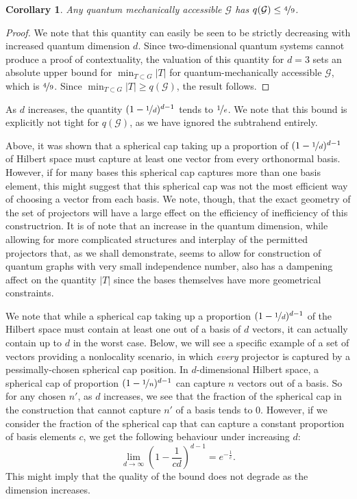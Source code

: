 \documentclass{amsart}
\newtheorem{cor}{Corollary}
\theoremstyle{definition}
\begin{document}
\begin{cor}
Any quantum mechanically accessible $\mathcal{G}$ has  $q(\mathcal{G})\leq\nicefrac49$.
\end{cor}
\begin{proof}
We note that this quantity can easily be seen to be strictly decreasing with increased quantum dimension $d$. Since two-dimensional quantum systems cannot produce a proof of contextuality, the valuation of this quantity for $d=3$ sets an absolute upper bound for $\min_{T\subset G}|T|$ for quantum-mechanically accessible $\mathcal{G}$, which is $\nicefrac49$. Since $\min_{T\subset G}|T|\geq q(\mathcal{G})$, the result follows.
\end{proof}
As $d$ increases, the quantity $(1-\nicefrac1d)^{d-1}$ tends to $\nicefrac1e$. We note that this bound is explicitly not tight for $q(\mathcal{G})$, as we have ignored the subtrahend entirely. %

Above, it was shown that a spherical cap taking up a proportion of $(1-\nicefrac1d)^{d-1}$ of Hilbert space must capture at least one vector from every orthonormal basis. However, if for many bases this spherical cap captures more than one basis element, this might suggest that this spherical cap was not the most efficient way of choosing a vector from each basis. We note, though, that the exact geometry of the set of projectors will have a large effect on the efficiency of inefficiency of this constructrion. It is of note that an increase in the quantum dimension, while allowing for more complicated structures and interplay of the permitted projectors that, as we shall demonstrate, seems to allow for construction of quantum graphs with very small independence number, also has a dampening affect on the quantity $|T|$ since the bases themselves have more geometrical constraints.

We note that while a spherical cap taking up a proportion $(1-\nicefrac1d)^{d-1}$ of the Hilbert space must contain at least one out of a basis of $d$ vectors, it can actually contain up to $d$ in the worst case. Below, we will see a specific example of a set of vectors providing a nonlocality scenario, in which \emph{every} projector is captured by a pessimally-chosen spherical cap position. In $d$-dimensional Hilbert space, a spherical cap of proportion $(1-\nicefrac1n)^{d-1}$ can capture $n$ vectors out of a basis. So for any chosen $n'$, as $d$ increases, we see that the fraction of the spherical cap in the construction that cannot capture $n'$ of a basis tends to 0. However, if we consider the fraction of the spherical cap that can capture a constant proportion of basis elements $c$, we get the following behaviour under increasing $d$:
\begin{equation}
\lim_{d\rightarrow\infty} \left(1-\frac{1}{cd}\right)^{d-1}=e^{-\frac1c}.
\end{equation}
This might imply that the quality of the bound does not degrade as the dimension increases.%
\end{document}
